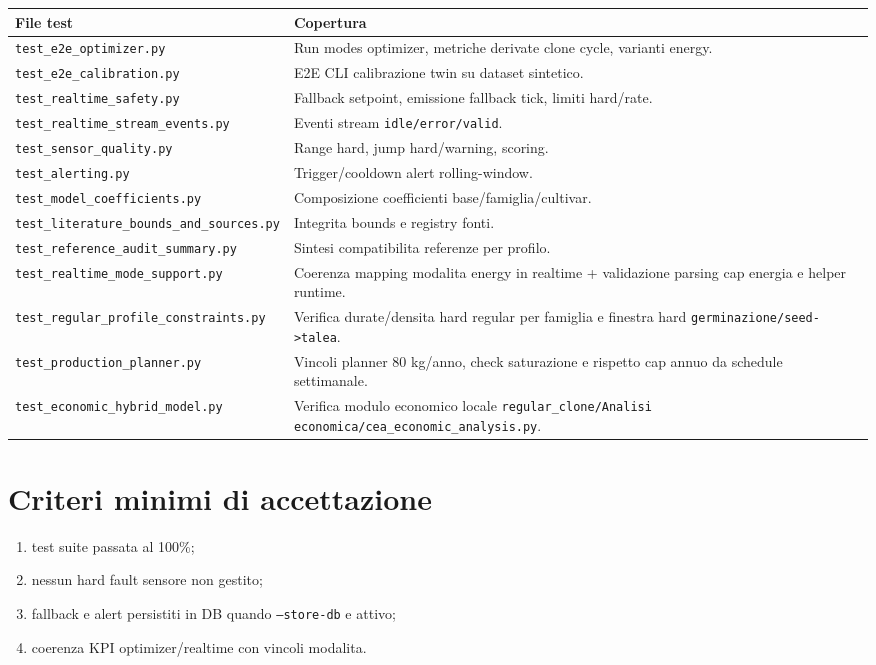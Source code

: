 ﻿\documentclass[11pt,a4paper]{report}
\begin{document}
\begin{longtable}{@{}p{5.2cm}p{8.0cm}@{}}
\toprule
File test & Copertura \\ \midrule
\texttt{test\_e2e\_optimizer.py} & Run modes optimizer, metriche derivate clone cycle, varianti energy. \\
\texttt{test\_e2e\_calibration.py} & E2E CLI calibrazione twin su dataset sintetico. \\
\texttt{test\_realtime\_safety.py} & Fallback setpoint, emissione fallback tick, limiti hard/rate. \\
\texttt{test\_realtime\_stream\_events.py} & Eventi stream \texttt{idle/error/valid}. \\
\texttt{test\_sensor\_quality.py} & Range hard, jump hard/warning, scoring. \\
\texttt{test\_alerting.py} & Trigger/cooldown alert rolling-window. \\
\texttt{test\_model\_coefficients.py} & Composizione coefficienti base/famiglia/cultivar. \\
\texttt{test\_literature\_bounds\_and\_sources.py} & Integrita bounds e registry fonti. \\
\texttt{test\_reference\_audit\_summary.py} & Sintesi compatibilita referenze per profilo. \\
\texttt{test\_realtime\_mode\_support.py} & Coerenza mapping modalita energy in realtime + validazione parsing cap energia e helper runtime. \\
\texttt{test\_regular\_profile\_constraints.py} & Verifica durate/densita hard regular per famiglia e finestra hard \texttt{germinazione/seed->talea}. \\
\texttt{test\_production\_planner.py} & Vincoli planner 80 kg/anno, check saturazione e rispetto cap annuo da schedule settimanale. \\
\texttt{test\_economic\_hybrid\_model.py} & Verifica modulo economico locale \texttt{regular\_clone/Analisi economica/cea\_economic\_analysis.py}. \\
\bottomrule
\end{longtable}

\section{Criteri minimi di accettazione}
\begin{enumerate}
  \item test suite passata al 100\%;
  \item nessun hard fault sensore non gestito;
  \item fallback e alert persistiti in DB quando \texttt{--store-db} e attivo;
  \item coerenza KPI optimizer/realtime con vincoli modalita.
\end{enumerate}
\end{document}
